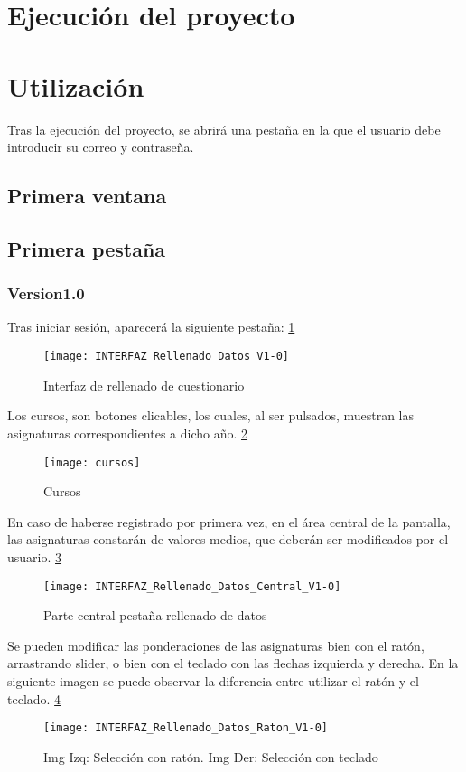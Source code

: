 \section{Ejecución del proyecto}


\section{Utilización}
Tras la ejecución del proyecto, se abrirá una pestaña en la que el usuario debe introducir su correo y contraseña. 
\subsection{Primera ventana}



\subsection{Primera pestaña}
\subsubsection{Version1.0}
Tras iniciar sesión, aparecerá la siguiente pestaña: \ref{fig:E.2.1}
\begin{figure}[h]
\centering
\texttt{[image: INTERFAZ\_Rellenado\_Datos\_V1-0]}
\caption{Interfaz de rellenado de cuestionario}
\label{fig:E.2.1}
\end{figure}
Los cursos, son botones clicables, los cuales, al ser pulsados, muestran las asignaturas correspondientes a dicho año. \ref{fig:E.2.2}
\begin{figure}[h]
\centering
\texttt{[image: cursos]}
\caption{Cursos}
\label{fig:E.2.2}
\end{figure}

En caso de haberse registrado por primera vez, en el área central de la pantalla, las asignaturas constarán de valores medios, que deberán ser modificados por el usuario. \ref{fig:E.2.3}
\begin{figure}[h]
\centering
\texttt{[image: INTERFAZ\_Rellenado\_Datos\_Central\_V1-0]}
\caption{Parte central pestaña rellenado de datos}
\label{fig:E.2.3}
\end{figure}
Se pueden modificar las ponderaciones de las asignaturas bien con el ratón, arrastrando  slider, o bien con el teclado con las flechas izquierda y derecha. En la siguiente imagen se puede observar la diferencia entre utilizar el ratón y el teclado. \ref{fig:E.2.4}
\begin{figure}[h]
\centering
\texttt{[image: INTERFAZ\_Rellenado\_Datos\_Raton\_V1-0]}
\caption{Img Izq: Selección con ratón. Img Der: Selección con teclado}
\label{fig:E.2.4}
\end{figure}

